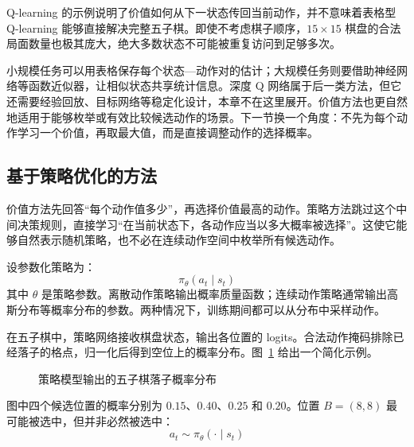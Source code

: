 \documentclass[UTF8,a4paper,zihao=-4,oneside,openany]{ctexbook}
\begin{document}
\begin{importantnote}
Q-learning 的示例说明了价值如何从下一状态传回当前动作，并不意味着表格型 Q-learning 能够直接解决完整五子棋。即使不考虑棋子顺序，$15\times15$ 棋盘的合法局面数量也极其庞大，绝大多数状态不可能被重复访问到足够多次。
\end{importantnote}

小规模任务可以用表格保存每个状态—动作对的估计；大规模任务则要借助神经网络等函数近似器，让相似状态共享统计信息。深度 Q 网络属于后一类方法，但它还需要经验回放、目标网络等稳定化设计，本章不在这里展开。价值方法也更自然地适用于能够枚举或有效比较候选动作的场景。下一节换一个角度：不先为每个动作学习一个价值，再取最大值，而是直接调整动作的选择概率。

\subsection{基于策略优化的方法}

价值方法先回答“每个动作值多少”，再选择价值最高的动作。策略方法跳过这个中间决策规则，直接学习“在当前状态下，各动作应当以多大概率被选择”。这使它能够自然表示随机策略，也不必在连续动作空间中枚举所有候选动作。

设参数化策略为：
\begin{equation}
\pi_{\theta}(a_t\mid s_t)
\end{equation}
其中 $\theta$ 是策略参数。离散动作策略输出概率质量函数；连续动作策略通常输出高斯分布等概率分布的参数。两种情况下，训练期间都可以从分布中采样动作。

在五子棋中，策略网络接收棋盘状态，输出各位置的 logits。合法动作掩码排除已经落子的格点，归一化后得到空位上的概率分布。图~\ref{fig:gobang_policy_distribution} 给出一个简化示例。

\begin{figure}[htbp]
  \centering
  \caption{策略模型输出的五子棋落子概率分布}
  \label{fig:gobang_policy_distribution}
\end{figure}

图中四个候选位置的概率分别为 $0.15$、$0.40$、$0.25$ 和 $0.20$。位置 $B=(8,8)$ 最可能被选中，但并非必然被选中：
\begin{equation}
a_t
\sim
\pi_{\theta}(\cdot\mid s_t)
\end{equation}
\end{document}
